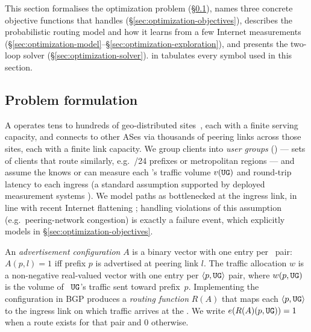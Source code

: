 \documentclass[acmsmall,anonymous,review,nonacm,10pt]{acmart}
\begin{document}
This section formalises the optimization problem
(\S\ref{sec:optimization-formulation}), names three concrete
objective functions that \sparse handles
(\S\ref{sec:optimization-objectives}), describes the probabilistic
routing model and how it learns from a few Internet measurements
(\S\ref{sec:optimization-model}--\S\ref{sec:optimization-exploration}),
and presents the two-loop solver
(\S\ref{sec:optimization-solver}).
 in  tabulates every
symbol used in this section.

\subsection{Problem formulation}
\label{sec:optimization-formulation}

  A \servprod operates tens to hundreds of
geo-distributed sites~\cite{msft-wan-numbers}, each with a finite
serving capacity, and connects to other ASes via thousands of
peering links across those sites, each with a finite link capacity.
We group clients into \emph{user groups} (\ugs) --- sets of clients
that route similarly, e.g.\ /24 prefixes or metropolitan regions
--- and assume the \servprod knows or can measure each \ug's
traffic volume $v(\texttt{UG})$ and round-trip latency to each
ingress (a standard assumption supported by deployed measurement
systems
\cite{odin,end-user-mapping,verfploeter,calder-nel,anyopt,painter}).
We model paths as bottlenecked at the ingress link, in line with
recent Internet flattening
\cite{todd-cloud-connectivity}; handling violations of this
assumption (e.g.\ peering-network congestion) is exactly a
failure event, which \sparse explicitly models in
\S\ref{sec:optimization-objectives}.

  An \emph{advertisement configuration}
$A$ is a binary vector with one entry per \peerprefix~pair: $A(p,l)=1$
iff prefix $p$ is advertised at peering link $l$.  The traffic
allocation $w$ is a non-negative real-valued vector with one entry
per $\langle p, \texttt{UG}\rangle$ pair, where $w(p,\texttt{UG})$ is the
volume of \ug~$\texttt{UG}$'s traffic sent toward prefix~$p$.
Implementing the configuration in BGP produces a \emph{routing
function} $R(A)$ that maps each $\langle p,\texttt{UG}\rangle$ to the
ingress link on which traffic arrives at the \servprod.  We write
$e(R(A)(p,\texttt{UG}))=1$ when a route exists for that pair and 0
otherwise.
\end{document}
